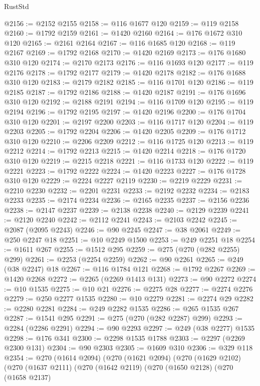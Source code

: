 \begin{lexlean}{RustStd}
\begin{coremodule}
@2156 := @2152 @2155
@2158 := @116 @1677 @120
@2159 := @119 @2158
@2160 := @1792 @2159
@2161 := @1420 @2160
@2164 := @176 @1672 @310 @120
@2165 := @2161 @2164
@2167 := @116 @1685 @120
@2168 := @119 @2167
@2169 := @1792 @2168
@2170 := @1420 @2169
@2173 := @176 @1680 @310 @120
@2174 := @2170 @2173
@2176 := @116 @1693 @120
@2177 := @119 @2176
@2178 := @1792 @2177
@2179 := @1420 @2178
@2182 := @176 @1688 @310 @120
@2183 := @2179 @2182
@2185 := @116 @1701 @120
@2186 := @119 @2185
@2187 := @1792 @2186
@2188 := @1420 @2187
@2191 := @176 @1696 @310 @120
@2192 := @2188 @2191
@2194 := @116 @1709 @120
@2195 := @119 @2194
@2196 := @1792 @2195
@2197 := @1420 @2196
@2200 := @176 @1704 @310 @120
@2201 := @2197 @2200
@2203 := @116 @1717 @120
@2204 := @119 @2203
@2205 := @1792 @2204
@2206 := @1420 @2205
@2209 := @176 @1712 @310 @120
@2210 := @2206 @2209
@2212 := @116 @1725 @120
@2213 := @119 @2212
@2214 := @1792 @2213
@2215 := @1420 @2214
@2218 := @176 @1720 @310 @120
@2219 := @2215 @2218
@2221 := @116 @1733 @120
@2222 := @119 @2221
@2223 := @1792 @2222
@2224 := @1420 @2223
@2227 := @176 @1728 @310 @120
@2229 := @2224 @2227 @2119
@2230 := @2219 @2229
@2231 := @2210 @2230
@2232 := @2201 @2231
@2233 := @2192 @2232
@2234 := @2183 @2233
@2235 := @2174 @2234
@2236 := @2165 @2235
@2237 := @2156 @2236
@2238 := @2147 @2237
@2239 := @2138 @2238
@2240 := @2129 @2239
@2241 := @2120 @2240
@2242 := @2112 @2241
@2243 := @2103 @2242
@2245 := @2087 (@2095 @2243)
@2246 := @90 @2245
@2247 := @38 @2061
@2249 := @250 @2247 @18
@2251 := @10 @2249 @1500
@2253 := @249 @2251 @18
@2254 := @1611 @267
@2255 := @1512 @295
@2259 := @275 (@270 (@282 @2255) @299)
@2261 := @2253 (@2254 @2259)
@2262 := @90 @2261
@2265 := @249 (@38 @2247) @18
@2267 := @116 @1784 @121
@2268 := @1792 @2267
@2269 := @1420 @2268
@2272 := @2265 (@2269 @1413 @131)
@2273 := @90 @2272
@2274 := @10 @1535
@2275 := @10 @21
@2276 := @2275 @28
@2277 := @2274 @2276
@2279 := @250 @2277 @1535
@2280 := @10 @2279
@2281 := @2274 @29
@2282 := @2280 @2281
@2284 := @249 @2282 @1535
@2286 := @265 @1535 @267
@2287 := @1541 @295
@2291 := @275 (@270 (@282 @2287) @299)
@2293 := @2284 (@2286 @2291)
@2294 := @90 @2293
@2297 := @249 (@38 @2277) @1535
@2298 := @176 @341
@2300 := @2298 @1535 @1788
@2303 := @2297 (@2269 @2300 @131)
@2304 := @90 @2303
@2305 := @1609 @310
@2306 := @329 @118
@2354 := @270
    (@1614 @2094)
    (@270
      (@1621 @2094)
      (@270
        (@1629 @2102)
        (@270
          (@1637 @2111)
          (@270
            (@1642 @2119)
            (@270
              (@1650 @2128)
              (@270
                (@1658 @2137)

\end{coremodule}
\end{lexlean}
